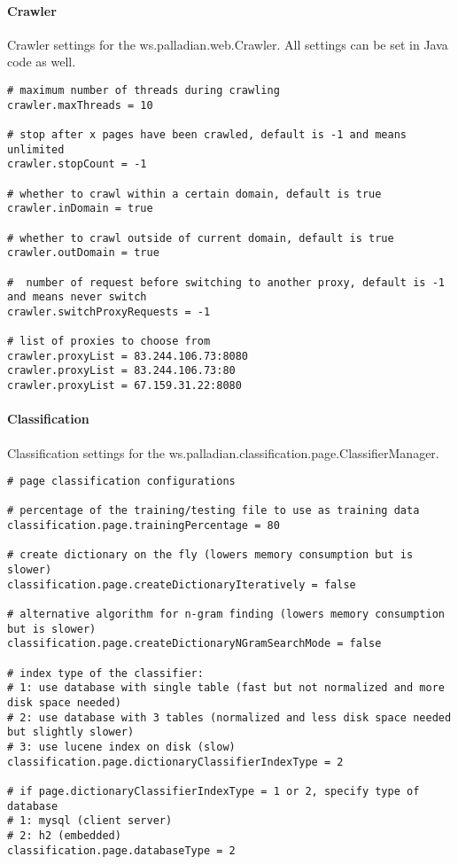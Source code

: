 \paragraph{Crawler}
\label{sec:crawler.conf}
Crawler settings for the ws.palladian.web.Crawler. All settings can be set in Java code as well.

\begin{verbatim}
# maximum number of threads during crawling
crawler.maxThreads = 10

# stop after x pages have been crawled, default is -1 and means unlimited
crawler.stopCount = -1

# whether to crawl within a certain domain, default is true
crawler.inDomain = true
	
# whether to crawl outside of current domain, default is true
crawler.outDomain = true

#  number of request before switching to another proxy, default is -1 and means never switch
crawler.switchProxyRequests = -1
	
# list of proxies to choose from
crawler.proxyList = 83.244.106.73:8080
crawler.proxyList = 83.244.106.73:80
crawler.proxyList = 67.159.31.22:8080
\end{verbatim}

\paragraph{Classification}
\label{sec:classification.conf}
Classification settings for the ws.palladian.classification.page.ClassifierManager.

\begin{verbatim}
# page classification configurations

# percentage of the training/testing file to use as training data
classification.page.trainingPercentage = 80

# create dictionary on the fly (lowers memory consumption but is slower)
classification.page.createDictionaryIteratively = false

# alternative algorithm for n-gram finding (lowers memory consumption but is slower)
classification.page.createDictionaryNGramSearchMode = false

# index type of the classifier:
# 1: use database with single table (fast but not normalized and more disk space needed)
# 2: use database with 3 tables (normalized and less disk space needed but slightly slower)
# 3: use lucene index on disk (slow)
classification.page.dictionaryClassifierIndexType = 2

# if page.dictionaryClassifierIndexType = 1 or 2, specify type of database
# 1: mysql (client server)
# 2: h2 (embedded)
classification.page.databaseType = 2
\end{verbatim}

